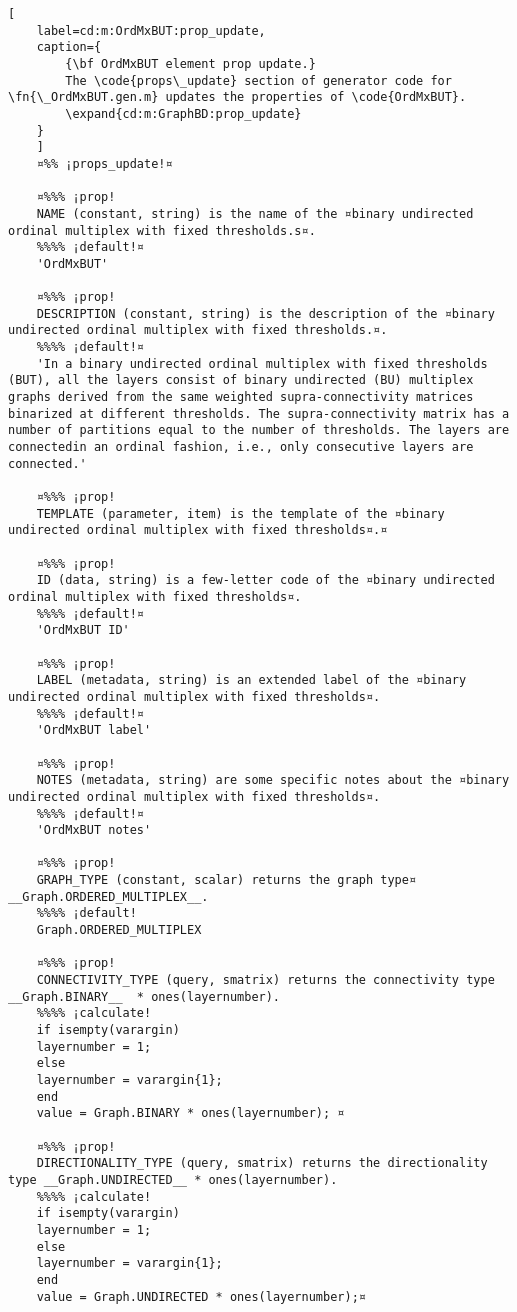 \documentclass{tufte-handout}
\begin{document}
\begin{lstlisting}[
	label=cd:m:OrdMxBUT:prop_update,
	caption={
		{\bf OrdMxBUT element prop update.}
		The \code{props\_update} section of generator code for \fn{\_OrdMxBUT.gen.m} updates the properties of \code{OrdMxBUT}.
		\expand{cd:m:GraphBD:prop_update}
	}
	]
	¤%% ¡props_update!¤
	
	¤%%% ¡prop!
	NAME (constant, string) is the name of the ¤binary undirected ordinal multiplex with fixed thresholds.s¤.
	%%%% ¡default!¤
	'OrdMxBUT'
	
	¤%%% ¡prop!
	DESCRIPTION (constant, string) is the description of the ¤binary undirected ordinal multiplex with fixed thresholds.¤.
	%%%% ¡default!¤
	'In a binary undirected ordinal multiplex with fixed thresholds (BUT), all the layers consist of binary undirected (BU) multiplex graphs derived from the same weighted supra-connectivity matrices binarized at different thresholds. The supra-connectivity matrix has a number of partitions equal to the number of thresholds. The layers are connectedin an ordinal fashion, i.e., only consecutive layers are connected.'
	
	¤%%% ¡prop!
	TEMPLATE (parameter, item) is the template of the ¤binary undirected ordinal multiplex with fixed thresholds¤.¤
	
	¤%%% ¡prop!
	ID (data, string) is a few-letter code of the ¤binary undirected ordinal multiplex with fixed thresholds¤.
	%%%% ¡default!¤
	'OrdMxBUT ID'
	
	¤%%% ¡prop!
	LABEL (metadata, string) is an extended label of the ¤binary undirected ordinal multiplex with fixed thresholds¤.
	%%%% ¡default!¤
	'OrdMxBUT label'
	
	¤%%% ¡prop!
	NOTES (metadata, string) are some specific notes about the ¤binary undirected ordinal multiplex with fixed thresholds¤.
	%%%% ¡default!¤
	'OrdMxBUT notes'
	
	¤%%% ¡prop!
	GRAPH_TYPE (constant, scalar) returns the graph type¤ __Graph.ORDERED_MULTIPLEX__.
	%%%% ¡default!
	Graph.ORDERED_MULTIPLEX
	
	¤%%% ¡prop!
	CONNECTIVITY_TYPE (query, smatrix) returns the connectivity type __Graph.BINARY__  * ones(layernumber).
	%%%% ¡calculate!
	if isempty(varargin)
	layernumber = 1;
	else
	layernumber = varargin{1};
	end
	value = Graph.BINARY * ones(layernumber); ¤
	
	¤%%% ¡prop!
	DIRECTIONALITY_TYPE (query, smatrix) returns the directionality type __Graph.UNDIRECTED__ * ones(layernumber).
	%%%% ¡calculate!
	if isempty(varargin)
	layernumber = 1;
	else
	layernumber = varargin{1};
	end
	value = Graph.UNDIRECTED * ones(layernumber);¤
	

\end{lstlisting}
\end{document}
